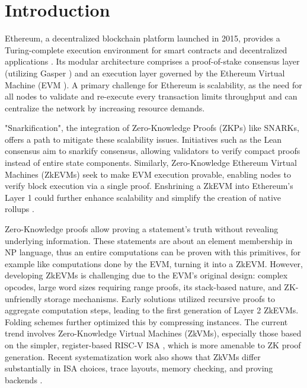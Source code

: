 \chapter{Introduction}

Ethereum, a decentralized blockchain platform launched in 2015, provides a
Turing-complete execution environment for smart contracts and decentralized
applications \cite{ethereumEthereumWhitepaper}. Its modular architecture
comprises a proof-of-stake consensus layer (utilizing Gasper \cite{VitalikGasper}) and
an execution layer governed by the Ethereum Virtual Machine (EVM
\cite{ethereumConsensusMechanisms}). A primary challenge for Ethereum is
scalability, as the need for all nodes to validate and re-execute every
transaction limits throughput and can centralize the network by increasing
resource demands.

"Snarkification", the integration of Zero-Knowledge Proofs (ZKPs) like SNARKs,
offers a path to mitigate these scalability issues. Initiatives such as the
Lean consensus \cite{LeanConsensus} aim to snarkify consensus, allowing
validators to verify compact proofs instead of entire state components.
Similarly, Zero-Knowledge Ethereum Virtual Machines (ZkEVMs) seek to make EVM
execution provable, enabling nodes to verify block execution via a single
proof. Enshrining a ZkEVM into Ethereum's Layer 1 could further enhance
scalability and simplify the creation of native rollups \cite{NativeRollups}.

Zero-Knowledge proofs allow proving a statement's truth without revealing
underlying information. These statements are about an element membership in NP
language, thus an entire computations can be proven with this primitives, for example
like computations done by the EVM, turning it into a ZkEVM. However,
developing ZkEVMs is challenging due to the EVM's original design: complex
opcodes, large word sizes requiring range proofs, its stack-based nature, and
ZK-unfriendly storage mechanisms. Early solutions utilized recursive proofs to
aggregate computation steps, leading to the first generation of Layer 2
ZkEVMs. Folding schemes further optimized this by compressing instances. The
current trend involves Zero-Knowledge Virtual Machines (ZkVMs), especially
those based on the simpler, register-based RISC-V ISA \cite{RISCV, RISCVUnprivileged}, which is
more amenable to ZK proof generation. Recent systematization work also shows
that ZkVMs differ substantially in ISA choices, trace layouts, memory checking,
and proving backends \cite{SoKZkVMs}.

